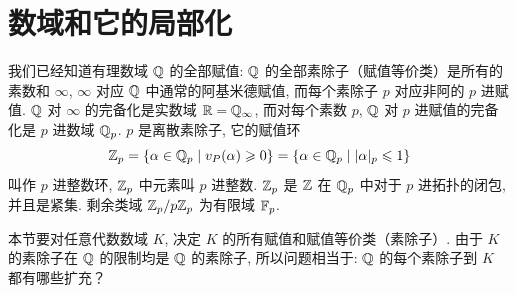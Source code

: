 \section{数域和它的局部化}\label{sec:ch8-s5}

我们已经知道有理数域 $\mathbb{Q}$ 的全部赋值: $\mathbb{Q}$ 的全部素除子（赋值等价类）是所有的素数和 $\infty$, $\infty$ 对应 $\mathbb{Q}$ 中通常的阿基米德赋值, 而每个素除子 $p$ 对应非阿的 $p$ 进赋值. $\mathbb{Q}$ 对 $\infty$ 的完备化是实数域 $\mathbb{R}=\mathbb{Q}_{\infty}$, 而对每个素数 $p$, $\mathbb{Q}$ 对 $p$ 进赋值的完备化是 $p$ 进数域 $\mathbb{Q}_p$. $p$ 是离散素除子, 它的赋值环
\[
  \mathbb{Z}_p=\{\alpha\in\mathbb{Q}_p\mid v_P(\alpha)\geqslant 0\}
  =\{\alpha\in\mathbb{Q}_p\mid|\alpha|_p\leqslant 1\}
\]
叫作 $p$ 进整数环, $\mathbb{Z}_p$ 中元素叫 $p$ 进整数. $\mathbb{Z}_p$ 是 $\mathbb{Z}$ 在 $\mathbb{Q}_p$ 中对于 $p$ 进拓扑的闭包, 并且是紧集. 剩余类域 $\mathbb{Z}_p/p\mathbb{Z}_p$ 为有限域 $\mathbb{F}_p$.

本节要对任意代数数域 $K$, 决定 $K$ 的所有赋值和赋值等价类（素除子）. 由于 $K$ 的素除子在 $\mathbb{Q}$ 的限制均是 $\mathbb{Q}$ 的素除子, 所以问题相当于: $\mathbb{Q}$ 的每个素除子到 $K$ 都有哪些扩充？

